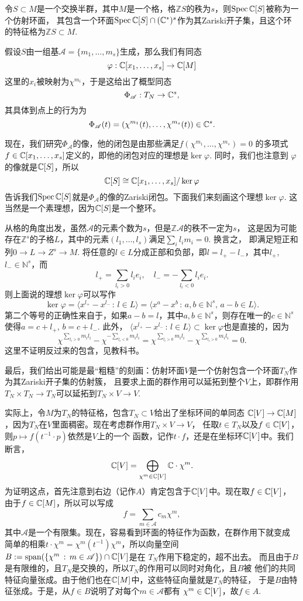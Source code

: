 \para[仿射环面] 令$S\subset M$是一个交换半群，其中$M$是一个格，格$\mathbb ZS$的秩为$s$，则$\operatorname{Spec} \mathbb{C}[S]$被称为一个仿射环面，
其包含一个环面$\operatorname{Spec} \mathbb{C}[S]\cap (\mathbb{C}^*)^s$作为其Zariski开子集，且这个环的特征格为$\mathbb ZS\subset M$.

假设$S$由一组基$\mathscr A=\{m_1,\dots,m_s\}$生成，那么我们有同态
\[
    \varphi:\mathbb{C}[x_1,\dots,x_s]\to \mathbb{C}[M]
\]
这里的$x_i$被映射为$\chi^{m_i}$，于是这给出了概型同态
\[
    \Phi_{\mathscr A}:T_N\to \mathbb{C}^s,
\]
其具体到点上的行为为
\[
    \Phi_{\mathscr A}(t)=(\chi^{m_1}(t),\dots,\chi^{m_s}(t))\in \mathbb{C}^s.
\]

现在，我们研究$\Phi_{\mathscr A}$的像，他的闭包是由那些满足$f(\chi^{m_1},\dots,\chi^{m_s})=0$
的多项式$f\in \mathbb{C}[x_1,\dots,x_s]$定义的，即他的闭包对应的理想是$\ker\varphi$. 同时，我们也注意到
$\varphi$的像就是$\mathbb{C}[S]$，所以
\[
    \mathbb{C}[S]\cong \mathbb{C}[x_1,\dots,x_s]/\ker \varphi
\]
告诉我们$\operatorname{Spec} \mathbb{C}[S]$就是$\Phi_{\mathscr A}$的像的Zariski闭包。下面我们来刻画这个理想$\ker\varphi$.
这当然是一个素理想，因为$\mathbb{C}[S]$是一个整环。

从格的角度出发，虽然$\mathscr A$的元素个数为$s$，但是$\mathbb Z\mathscr A$的秩不一定为$s$，
这是因为可能存在$\mathbb Z^s$的子格$L$，其中的元素$(l_1,\dots,l_s)$满足$\sum_i l_im_i=0$. 换言之，
即满足短正和列$0\to L\to Z^s\to M$. 将任意的$l\in L$分成正部和负部，即$l=l_+-l_-$，其中$l_+$, $l_-\in \mathbb N^s$，而
\[
    l_+=\sum_{l_i>0}l_ie_i,\quad l_-=-\sum_{l_i<0}l_ie_i.
\]
则上面说的理想$\ker \varphi$可以写作
\[
    \ker\varphi=\langle x^{l_+}-x^{l_-}\,:\, l\in L\rangle=
    \langle x^{a}-x^{b}\,:\, a,b\in \mathbb N^s,\, a-b\in L\rangle.
\]
第二个等号的正确性来自于，如果$a-b=l$，其中$a,b\in \mathbb N^s$，则存在唯一的$c\in \mathbb N^s$
使得$a=c+l_+$, $b=c+l_-$. 此外，
$\langle x^{l_+}-x^{l_-}\,:\, l\in L\rangle\subset \ker\varphi$也是直接的，因为
\[
    \chi^{\sum_{l_i>0} m_il_i}-\chi^{-\sum_{l_i<0} m_il_i}=
    \chi^{\sum_{l_i>0} m_il_i}-\chi^{\sum_{l_i>0} m_il_i}=0.
\]
这里不证明反过来的包含，见教科书。

最后，我们给出可能是最“粗糙”的刻画：仿射环面$V$是一个仿射包含一个环面$T_N$作为其Zariski开子集的仿射簇，
且要求上面的群作用可以延拓到整个$V$上，即群作用$T_N\times T_N\to T_N$可以延拓到$T_N\times V\to V$.

实际上，令$M$为$T_N$的特征格，包含$T_N\subset V$给出了坐标环间的单同态
$\mathbb{C}[V]\to \mathbb{C}[M]$，因为$T_N$在$V$里面稠密。现在考虑群作用$T_N\times V\to V$，
任取$t\in T_N$以及$f\in \mathbb{C}[V]$，则$p\mapsto f(t^{-1}\cdot p)$依然是$V$上的一个
函数，记作$t\cdot f$，还是在坐标环$\mathbb{C}[V]$中。我们断言，
\[
    \mathbb{C}[V]=\bigoplus_{\chi^m\in \mathbb{C}[V]}\mathbb{C}\cdot\chi^m.
\]
为证明这点，首先注意到右边（记作$A$）肯定包含于$\mathbb{C}[V]$中。现在取$f\in \mathbb{C}[V]$，
由于$f\in \mathbb{C}[M]$，所以可以写成
\[
    f=\sum_{m\in\mathscr A}c_m \chi^m,
\]
其中$\mathscr A$是一个有限集。现在，容易看到环面的特征作为函数，在群作用下就变成
简单的相乘$t\cdot \chi^m=\chi^{m}(t^{-1})\chi^m$，所以向量空间
$B:=\operatorname{span}(\{\chi^m\,:\, m\in \mathscr A\})\cap \mathbb{C}[V]$是在
$T_N$作用下稳定的，超不出去。
而且由于$B$是有限维的，且$T_N$是交换的，所以$T_N$的作用可以同时对角化，且$B$被
他们的共同特征向量张成。由于他们也在$\mathbb{C}[M]$中，这些特征向量就是$T_N$的特征，
于是$B$由特征张成。于是，从$f\in B$说明了对每个$m\in \mathscr A$都有
$\chi^m\in \mathbb{C}[V]$，故$f\in A$.

